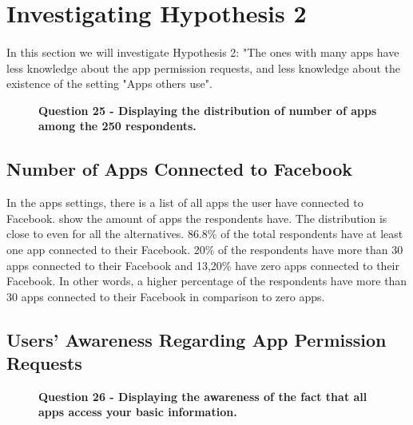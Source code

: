 \section{Investigating Hypothesis 2}

\paragraph{}
In this section we will investigate Hypothesis 2: "The ones with many apps have less knowledge about the app permission requests, and less knowledge about the existence of the setting "Apps others use". 

\begin{figure}[h!]
\centering
{}
\caption[Question 25 - Displaying the distribution of number of apps among the 250 respondents]{\textbf{Question 25 - Displaying the distribution of number of apps among the 250 respondents.}} 
\label{fig:appsyouuse}
\end{figure}

\subsection{Number of Apps Connected to Facebook}
In the apps settings, there is a list of all apps the user have connected to Facebook.  show the amount of apps the respondents have. The distribution is close to even for all the alternatives. 86.8\% of the total respondents have at least one app connected to their Facebook. 20\% of the respondents have more than 30 apps connected to their Facebook and 13,20\% have zero apps connected to their Facebook. In other words, a higher percentage of the respondents have more than 30 apps connected to their Facebook in comparison to zero apps. 

\subsection{Users' Awareness Regarding App Permission Requests}
\begin{figure}[h!]
\centering
{}
\caption[Question 26 - Displaying the awareness of the fact that all apps access your basic information]{\textbf{Question 26 - Displaying the awareness of the fact that all apps access your basic information.}} 
\label{fig:appsaccessbasicinfo}
\end{figure}

